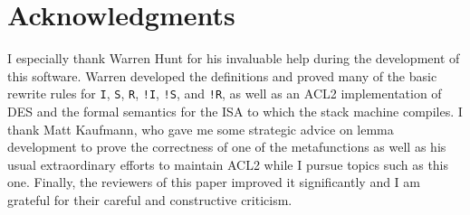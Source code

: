\documentclass[submission,copyright,creativecommons]{eptcs}
\newcommand{\ptt}[1]{\tt{#1}}
\begin{document}
\vspace*{1em}



\section{Acknowledgments}

I especially thank Warren Hunt for his invaluable help during
the development of this software.  Warren developed the definitions and
proved many of the basic rewrite rules for {\ptt{I}}, {\ptt{S}}, {\ptt{R}},
{\ptt{!I}}, {\ptt{!S}}, and {\ptt{!R}}, as well as an ACL2 implementation of
DES and the formal semantics for the ISA to which the stack machine compiles.
I thank Matt Kaufmann, who gave me some strategic advice
on lemma development to prove the correctness of one of the metafunctions as
well as his usual extraordinary efforts to maintain ACL2 while I pursue
topics such as this one.  Finally, the reviewers of this paper improved it
significantly and I am grateful for their careful and constructive criticism.
\end{document}
